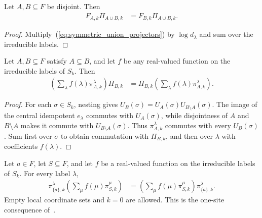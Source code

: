 \begin{theorem}
    \label{thm:symmetric_union_logarithmic_labels}
    \leanok
    Let $A,B\subseteq F$ be disjoint. Then
    \begin{align}
        F_{A,k}\Pi_{A\cup B,k}
         & =F_{B,k}\Pi_{A\cup B,k}.
        \label{eq:symmetric_union_logarithmic_labels}
    \end{align}
\end{theorem}

\begin{proof}\leanok
    Multiply~(\ref{eq:symmetric_union_projectors}) by
    $\log d_\lambda$ and sum over the irreducible labels.
\end{proof}

\begin{theorem}
    \label{thm:nested_label_observable_symmetry}
    \leanok
    Let $A,B\subseteq F$ satisfy $A\subseteq B$, and let $f$ be any
    real-valued function on the irreducible labels of $S_k$. Then
    \begin{align}
        \left(\sum_\lambda f(\lambda)\pi^\lambda_{A,k}\right)\Pi_{B,k}
         & =\Pi_{B,k}\left(\sum_\lambda f(\lambda)\pi^\lambda_{A,k}\right).
        \label{eq:nested_label_observable_symmetry}
    \end{align}
\end{theorem}

\begin{proof}\leanok
    For each $\sigma\in S_k$, nesting gives
    $U_B(\sigma)=U_A(\sigma)U_{B\setminus A}(\sigma)$.
    The image of the central idempotent $e_\lambda$ commutes with
    $U_A(\sigma)$, while disjointness of $A$ and $B\setminus A$ makes it
    commute with $U_{B\setminus A}(\sigma)$.
    Thus $\pi^\lambda_{A,k}$ commutes with every $U_B(\sigma)$.
    Sum first over $\sigma$ to obtain commutation with $\Pi_{B,k}$,
    and then over $\lambda$ with coefficients $f(\lambda)$.
\end{proof}


\begin{theorem}
    \label{thm:singleton_label_observable_commutation}
    \leanok
    Let $a\in F$, let $S\subseteq F$, and let $f$ be a real-valued
    function on the irreducible labels of $S_k$. For every label $\lambda$,
    \begin{align}
        \pi^\lambda_{\{a\},k}
        \left(\sum_\mu f(\mu)\pi^\mu_{S,k}\right)
         & =\left(\sum_\mu f(\mu)\pi^\mu_{S,k}\right)
        \pi^\lambda_{\{a\},k}.
    \end{align}
    Empty local coordinate sets and $k=0$ are allowed. This is the
    one-site consequence of~\cite[Lemma~6.1(2)]{OpenAI2026AreaLaw}.
\end{theorem}

